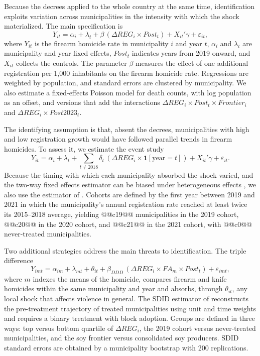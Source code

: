 \documentclass[11pt,a4paper]{article}
\begin{document}
Because the decrees applied to the whole country at the same time, identification exploits variation across municipalities in the intensity with which the shock materialized. The main specification is
\begin{equation}\label{eq:twfe}
Y_{it} = \alpha_i + \lambda_t + \beta\,(\Delta REG_i \times Post_t) + X_{it}'\gamma + \varepsilon_{it},
\end{equation}
where $Y_{it}$ is the firearm homicide rate in municipality $i$ and year $t$, $\alpha_i$ and $\lambda_t$ are municipality and year fixed effects, $Post_t$ indicates years from 2019 onward, and $X_{it}$ collects the controls. The parameter $\beta$ measures the effect of one additional registration per 1,000 inhabitants on the firearm homicide rate. Regressions are weighted by population, and standard errors are clustered by municipality. We also estimate a fixed-effects Poisson model for death counts, with log population as an offset, and versions that add the interactions $\Delta REG_i \times Post_t \times Frontier_i$ and $\Delta REG_i \times Post2023_t$.

The identifying assumption is that, absent the decrees, municipalities with high and low registration growth would have followed parallel trends in firearm homicides. To assess it, we estimate the event study
\begin{equation}
Y_{it} = \alpha_i + \lambda_t + \sum_{t\neq 2018}\delta_t\,(\Delta REG_i\times \mathbf{1}[\text{year}=t]) + X_{it}'\gamma + \varepsilon_{it}.
\end{equation}
Because the timing with which each municipality absorbed the shock varied, and the two-way fixed effects estimator can be biased under heterogeneous effects \citep{goodmanbacon2021,dechaisemartin2020,sun2021}, we also use the estimator of \citet{callaway2021}. Cohorts are defined by the first year between 2019 and 2021 in which the municipality's annual registration rate reached at least twice its 2015--2018 average, yielding @@c19@@ municipalities in the 2019 cohort, @@c20@@ in the 2020 cohort, and @@c21@@ in the 2021 cohort, with @@c0@@ never-treated municipalities.

Two additional strategies address the main threats to identification. The triple difference
\begin{equation}
Y_{imt} = \alpha_{im} + \lambda_{mt} + \theta_{it} + \beta_{DDD}\,(\Delta REG_i\times FA_m\times Post_t) + \varepsilon_{imt},
\end{equation}
where $m$ indexes the means of the homicide, compares firearm and knife homicides within the same municipality and year and absorbs, through $\theta_{it}$, any local shock that affects violence in general. The SDID estimator of \citet{arkhangelsky2021} reconstructs the pre-treatment trajectory of treated municipalities using unit and time weights and requires a binary treatment with block adoption. Groups are defined in three ways: top versus bottom quartile of $\Delta REG_i$, the 2019 cohort versus never-treated municipalities, and the soy frontier versus consolidated soy producers. SDID standard errors are obtained by a municipality bootstrap with 200 replications.
\end{document}
